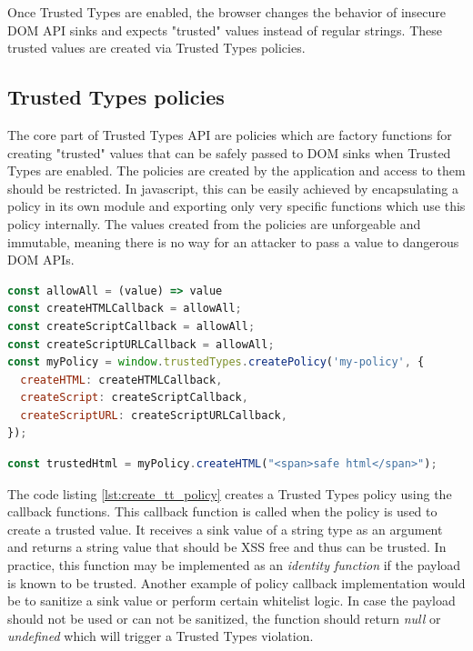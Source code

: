 Once Trusted Types are enabled, the browser changes the behavior of insecure DOM API sinks and
expects "trusted" values instead of regular strings. These trusted values are created via Trusted
Types policies.

\subsection{Trusted Types policies}
\label{subsec:tt_policy}

The core part of Trusted Types API are policies which are factory functions for creating "trusted"
values that can be safely passed to DOM sinks when Trusted Types are enabled. The policies are
created by the application and access to them should be restricted. In javascript, this can be
easily achieved by encapsulating a policy in its own module and exporting only very specific
functions which use this policy internally. The values created from the policies are unforgeable and
immutable, meaning there is no way for an attacker to pass a value to dangerous DOM APIs.

\bigskip
\begin{lstlisting}[language=JavaScript, caption=Creating a Trusted Types policy, label={lst:create_tt_policy}]
const allowAll = (value) => value
const createHTMLCallback = allowAll;
const createScriptCallback = allowAll;
const createScriptURLCallback = allowAll;
const myPolicy = window.trustedTypes.createPolicy('my-policy', {
  createHTML: createHTMLCallback,
  createScript: createScriptCallback,
  createScriptURL: createScriptURLCallback,
});
\end{lstlisting}

\bigskip
\begin{lstlisting}[language=JavaScript, caption=Create trusted value using a policy]
const trustedHtml = myPolicy.createHTML("<span>safe html</span>");
\end{lstlisting}

The code listing \ref{lst:create_tt_policy} creates a Trusted Types policy using the callback
functions. This callback function is called when the policy is used to create a trusted value. It
receives a sink value of a string type as an argument and returns a string value that should be XSS
free and thus can be trusted. In practice, this function may be implemented as an \emph{identity
  function} if the payload is known to be trusted. Another example of policy callback implementation
would be to sanitize a sink value or perform certain whitelist logic. In case the payload should not
be used or can not be sanitized, the function should return \emph{null} or \emph{undefined} which
will trigger a Trusted Types violation.


